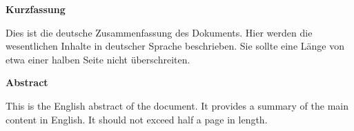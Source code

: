 \clearpage

\begin{center}
    {\LARGE\textbf{Kurzfassung}}
\end{center}
\vspace{1em}

Dies ist die deutsche Zusammenfassung des Dokuments. Hier werden die wesentlichen Inhalte in deutscher Sprache beschrieben. Sie sollte eine Länge von etwa einer halben Seite nicht überschreiten.

\vfil

\begin{center}
    {\LARGE\textbf{Abstract}}
\end{center}
\vspace{1em}

This is the English abstract of the document. It provides a summary of the main content in English. It should not exceed half a page in length.
